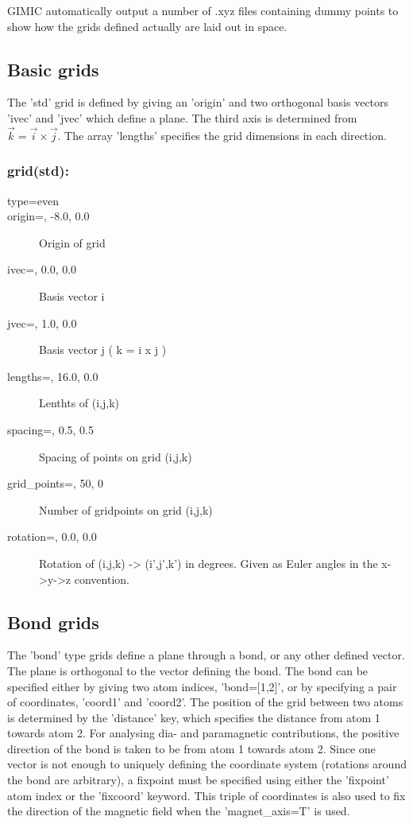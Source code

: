 \documentclass[a4paper,11pt]{article}
\begin{document}
GIMIC automatically output a number of .xyz files containing dummy points to
show how the grids defined actually are laid out in space. 

\subsection{Basic grids}
The 'std' grid is defined by giving an 'origin'
and two orthogonal basis vectors 'ivec' and 'jvec' which define a plane. The
third axis is determined from $\vec k=\vec i\times\vec j$.
The array 'lengths' specifies the grid dimensions in each direction.

\subsubsection*{grid(std):}
\begin{description}
  \item[type=even] 
  \item[origin=, -8.0, 0.0\rbrack]  Origin of grid
  \item[ivec=, 0.0, 0.0\rbrack]        Basis vector i
  \item[jvec=, 1.0, 0.0\rbrack]       Basis vector j ( k = i x j )
  \item[lengths=, 16.0, 0.0\rbrack]     Lenthts of (i,j,k)
  \item[spacing=, 0.5, 0.5\rbrack]  Spacing of points on grid (i,j,k)
  \item[grid\_points=, 50, 0\rbrack]    Number of gridpoints on grid (i,j,k)
  \item[rotation=, 0.0, 0.0\rbrack]   Rotation of (i,j,k) -> (i',j',k') in
	degrees. Given as Euler angles in the x->y->z convention.
\end{description}

\subsection{Bond grids}
The 'bond' type grids define a plane through a bond, or any other defined
vector. The plane is orthogonal to the vector defining the bond. The bond can
be specified either by giving two atom indices, 'bond=[1,2]', or by specifying
a pair of coordinates, 'coord1' and 'coord2'. The position of the grid between
two atoms is determined by the 'distance' key, which specifies the distance
from atom 1 towards atom 2.
For analysing dia- and
paramagnetic contributions, the positive direction of the bond is taken to be
from atom 1 towards atom 2. Since one vector is not enough to uniquely
defining the coordinate system (rotations around the bond are arbitrary), a
fixpoint must be specified using either the 'fixpoint' atom index or 
the 'fixcoord' keyword. This triple of coordinates is also used to fix the
direction of the magnetic field when the 'magnet\_axis=T' is used.
\end{document}
